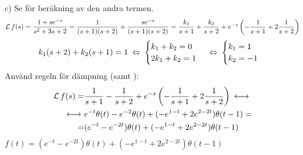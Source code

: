 \begin{task}{c)}
	Se  för beräkning av den andra termen.
	\[\operatorname{\mathcal{L}} f(s)=\frac{1+se^{-s}}{s^2+3s+2}=\frac{1}{(s+1)(s+2)}+\frac{se^{-s}}{(s+1)(s+2)}=\frac{k_1}{s+1}+\frac{k_2}{s+2}+e^{-s}\left(-\frac{1}{s+1}+2\frac{1}{s+2}\right)\]
	\[k_1(s+2)+k_2(s+1)=1\lra
	\begin{cases}
	k_1+k_2=0 \\
	2k_1+k_2=1
	\end{cases}\lra
	\begin{cases}
	k_1=1 \\
	k_2=-1
	\end{cases}\]
	Använd regeln för dämpning (samt ):
	\begin{align*}
	\laplace f(s)=
	&\frac{1}{s+1}-\frac{1}{s+2}+e^{-s}\left(-\frac{1}{s+1}+2\frac{1}{s+2}\right)\llra \\ \llra
	&e^{-t}\theta(t)-e^{-2}\theta(t)+(-e^{1-t}+2e^{2-2t})\theta(t-1)= \\ =
	&(e^{-t}-e^{-2t})\theta(t)+(-e^{1-t}+2e^{2-2t})\theta(t-1)
	\end{align*}
	\ans $f(t)=(e^{-t}-e^{-2t})\theta(t)+(-e^{1-t}+2e^{2-2t})\theta(t-1)$
\end{task}
